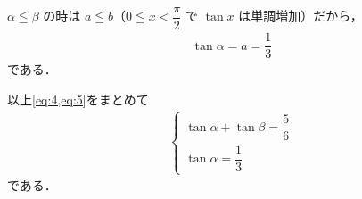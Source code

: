 \documentclass[../../main.tex]{subfiles}
\begin{document}
$\alpha \leqq \beta$ の時は $a \leqq b$（$0 \leqq x < \dfrac{\pi}{2}$ で $\tan x$ は単調増加）だから，
\begin{align}
  \tan\alpha = a = \dfrac{1}{3} \label{eq:5}
\end{align}
である．

以上\cref{eq:4,eq:5}をまとめて
\begin{align}
  \begin{cases}
    \tan\alpha + \tan\beta = \dfrac{5}{6} \\
    \tan\alpha = \dfrac{1}{3}
  \end{cases}
\end{align}
である．
\end{document}
